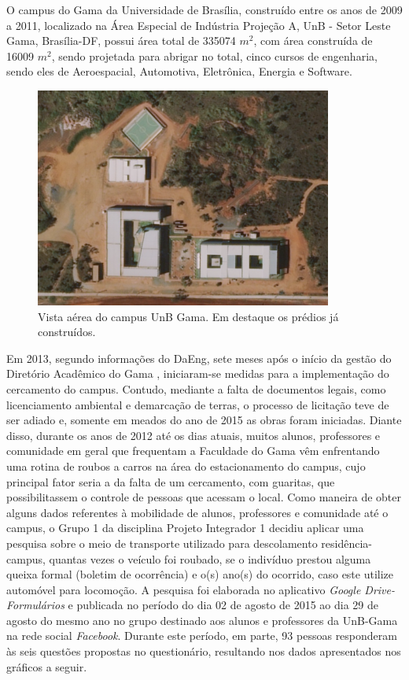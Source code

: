 O campus do Gama da Universidade de Brasília, construído entre os anos de 2009 a 2011, localizado na Área Especial de Indústria Projeção A, UnB - Setor Leste Gama, Brasília-DF, possui área total de 335074 $m^2$, com área construída de 16009 $m^2$, sendo projetada para abrigar no total, cinco cursos de engenharia, sendo eles de Aeroespacial, Automotiva, Eletrônica, Energia e Software.

\begin{figure}[H]
  \centering
  \includegraphics[width=0.87\textwidth]{figuras/fga1}
  \caption{Vista aérea do campus UnB Gama. Em destaque os prédios já construídos.}
  \label{img:fga1}
\end{figure}

Em 2013, segundo informações do DaEng, sete meses após o início da gestão do Diretório Acadêmico do Gama , iniciaram-se medidas para a implementação do cercamento do campus. Contudo, mediante a falta de documentos legais, como licenciamento ambiental e demarcação de terras, o processo de licitação teve de ser adiado e, somente em meados do ano de 2015 as obras foram iniciadas.
Diante disso, durante os anos de 2012 até os dias atuais, muitos alunos, professores e comunidade em geral que frequentam a Faculdade do Gama vêm enfrentando uma rotina de roubos a carros na área do estacionamento do campus, cujo principal fator seria a da falta de um cercamento, com guaritas, que possibilitassem o controle de pessoas que acessam o local.
Como maneira de obter alguns dados referentes à mobilidade de alunos, professores e comunidade até o campus, o Grupo 1 da disciplina Projeto Integrador 1 decidiu aplicar uma pesquisa sobre o meio de transporte utilizado para descolamento residência-campus,   quantas vezes o veículo foi roubado, se o indivíduo prestou alguma queixa formal (boletim de ocorrência) e o(s) ano(s) do ocorrido, caso este utilize automóvel para locomoção. A pesquisa foi elaborada no aplicativo \textit{Google Drive- Formulários} e publicada no período do dia 02 de agosto de 2015 ao dia 29 de agosto do mesmo ano no grupo destinado aos alunos e professores da UnB-Gama na rede social \textit{Facebook}. Durante este período, em parte, 93 pessoas responderam às seis questões propostas no questionário, resultando nos dados apresentados nos gráficos a seguir.


